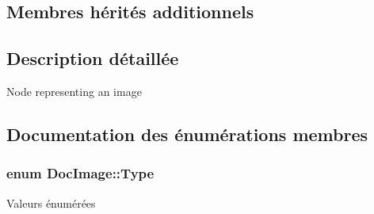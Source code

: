 \subsection*{Membres hérités additionnels}


\subsection{Description détaillée}
Node representing an image 

\subsection{Documentation des énumérations membres}
\hypertarget{class_doc_image_aaa49d1dad195745ff9d470c5335be93e}{}
\subsubsection[{Type}]{\setlength{\rightskip}{0pt plus 5cm}enum {\bf Doc\+Image\+::\+Type}}\label{class_doc_image_aaa49d1dad195745ff9d470c5335be93e}
\begin{Desc}
\item[Valeurs énumérées]\par
\begin{description}
\item[{\em 
\hypertarget{class_doc_image_aaa49d1dad195745ff9d470c5335be93ea11831c0ddc505e031751197b1bab0623}{}Html\label{class_doc_image_aaa49d1dad195745ff9d470c5335be93ea11831c0ddc505e031751197b1bab0623}
}]\item[{\em 
\hypertarget{class_doc_image_aaa49d1dad195745ff9d470c5335be93eaa40720221c0f30f373e9b3a9ec9711e5}{}Latex\label{class_doc_image_aaa49d1dad195745ff9d470c5335be93eaa40720221c0f30f373e9b3a9ec9711e5}
}]\item[{\em 
\hypertarget{class_doc_image_aaa49d1dad195745ff9d470c5335be93eaf742255bd9dc963b18e768c2b7fb7d70}{}Rtf\label{class_doc_image_aaa49d1dad195745ff9d470c5335be93eaf742255bd9dc963b18e768c2b7fb7d70}
}]\item[{\em 
\hypertarget{class_doc_image_aaa49d1dad195745ff9d470c5335be93ea725d162f5603b60f365bad17013c5d5a}{}Doc\+Book\label{class_doc_image_aaa49d1dad195745ff9d470c5335be93ea725d162f5603b60f365bad17013c5d5a}
}]\end{description}
\end{Desc}


